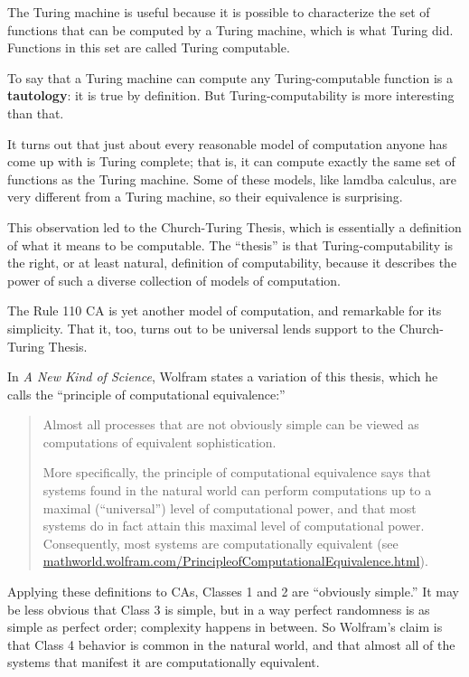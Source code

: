 \documentclass[10pt]{book}
\begin{document}
The Turing machine is useful because it is possible to characterize
the set of functions that can be computed by a Turing machine,
which is what Turing did.  Functions in this set are
called Turing computable.

To say that a Turing machine can compute any Turing-computable
function is a {\bf tautology}: it is true by definition.  But
Turing-computability is more interesting than that.

It turns out that just about every reasonable model of computation
anyone has come up with is Turing complete; that is, it can compute
exactly the same set of functions as the Turing machine.
Some of these models, like lamdba calculus, are very different
from a Turing machine, so their equivalence is surprising.

This observation led to the Church-Turing Thesis, which is essentially
a definition of what it means to be computable.  The ``thesis'' is
that Turing-computability is the right, or at least natural,
definition of computability, because it describes the power of such a
diverse collection of models of computation.

The Rule 110 CA is yet another model of computation, and remarkable
for its simplicity.  That it, too, turns out to be universal lends
support to the Church-Turing Thesis.

In {\em A New Kind of Science}, Wolfram states a variation of this
thesis, which he calls the ``principle of computational equivalence:''

\begin{quote}
Almost all processes that are not obviously simple can be viewed as
computations of equivalent sophistication.

More specifically, the principle of computational equivalence says
that systems found in the natural world can perform computations up to
a maximal (``universal'') level of computational power, and that most
systems do in fact attain this maximal level of computational
power. Consequently, most systems are computationally
equivalent (see
  \url{mathworld.wolfram.com/PrincipleofComputationalEquivalence.html}).
\end{quote}

Applying these definitions to CAs, Classes 1 and 2 are ``obviously
simple.''  It may be less obvious that Class 3 is simple, but in a way
perfect randomness is as simple as perfect order; complexity happens
in between.  So Wolfram's claim is that Class 4 behavior is common in
the natural world, and that almost all of the systems that manifest it
are computationally equivalent.
\end{document}
